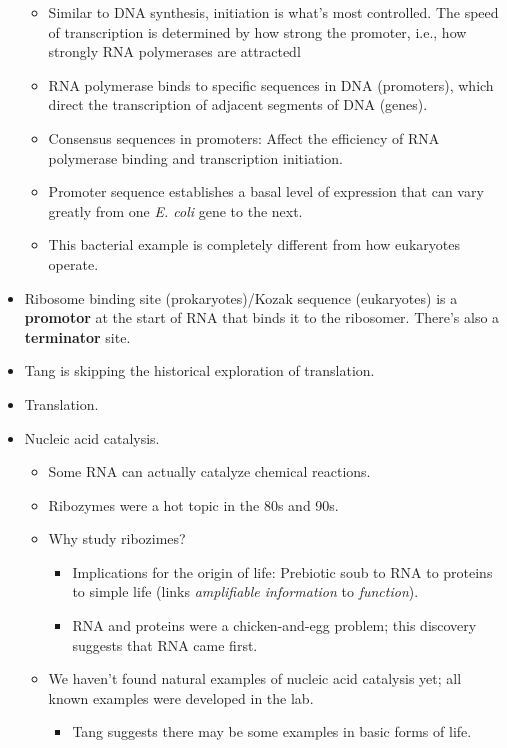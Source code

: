 \documentclass[../notes.tex]{subfiles}
\begin{document}
\begin{itemize}
\begin{itemize}
        \item Similar to DNA synthesis, initiation is what's most controlled. The speed of transcription is determined by how strong the promoter, i.e., how strongly RNA polymerases are attractedl
        \item RNA polymerase binds to specific sequences in DNA (promoters), which direct the transcription of adjacent segments of DNA (genes).
        \item Consensus sequences in promoters: Affect the efficiency of RNA polymerase binding and transcription initiation.
        \item Promoter sequence establishes a basal level of expression that can vary greatly from one \emph{E. coli} gene to the next.
        \item This bacterial example is completely different from how eukaryotes operate.
    \end{itemize}
    \item Ribosome binding site (prokaryotes)/Kozak sequence (eukaryotes) is a \textbf{promotor} at the start of RNA that binds it to the ribosomer. There's also a \textbf{terminator} site.
    \item Tang is skipping the historical exploration of translation.
    \item Translation.
    \item Nucleic acid catalysis.
    \begin{itemize}
        \item Some RNA can actually catalyze chemical reactions.
        \item Ribozymes were a hot topic in the 80s and 90s.
        \item Why study ribozimes?
        \begin{itemize}
            \item Implications for the origin of life: Prebiotic soub to RNA to proteins to simple life (links \emph{amplifiable information} to \emph{function}).
            \item RNA and proteins were a chicken-and-egg problem; this discovery suggests that RNA came first.
        \end{itemize}
        \item We haven't found natural examples of nucleic acid catalysis yet; all known examples were developed in the lab.
        \begin{itemize}
            \item Tang suggests there may be some examples in basic forms of life.

\end{itemize}
\end{itemize}
\end{itemize}
\end{document}
